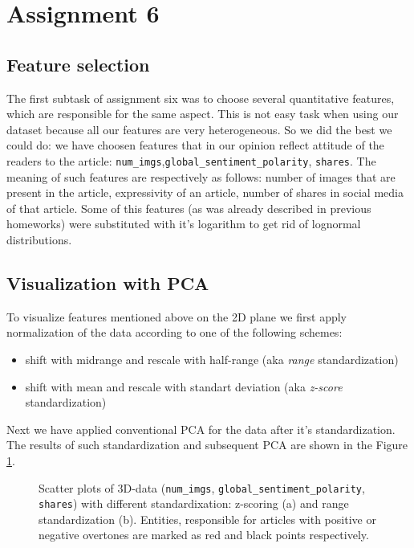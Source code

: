 \section{Assignment 6}
\subsection{Feature selection}
The first subtask of assignment six was to choose several quantitative  features, which are responsible for the same aspect.
This is not easy task when using our dataset because all our features are very heterogeneous.
So we did the best we could do: we have choosen features that in our opinion reflect attitude of the readers to the article: \texttt{num\_imgs},\texttt{global\_sentiment\_polarity},  \texttt{shares}. 
The meaning of such features are respectively as follows: number of images that are present in the article, expressivity of an article, number of shares in social media of that article. 
Some of this features (as was already described in previous homeworks) were substituted with it's logarithm  to get rid of lognormal distributions.

\subsection{Visualization with PCA}
To visualize features mentioned above on the 2D plane we first apply normalization of the data according to one of the following schemes: 
\begin{itemize}
	\item shift with midrange and rescale with half-range (aka \emph{range} standardization)
	\item shift with mean and rescale with standart deviation  (aka \emph{z-score} standardization)
\end{itemize}

Next we have applied conventional PCA for the data after it's standardization. 
The results of such standardization and subsequent PCA are shown in the Figure \ref{fig:PCA_hw6}.

\begin{figure}[h]
\hspace{-1cm}
\begin{minipage}[h]{0.49\linewidth}
\end{minipage}
\hfill
\begin{minipage}[h]{0.49\linewidth}
\end{minipage}
\caption{Scatter plots of 3D-data (\texttt{num\_imgs}, \texttt{global\_sentiment\_polarity},  \texttt{shares}) with different standardixation: z-scoring (a) and range standardization (b). Entities, responsible for articles with positive or negative overtones are marked as red and black points respectively.}
\label{fig:PCA_hw6}
\end{figure}

